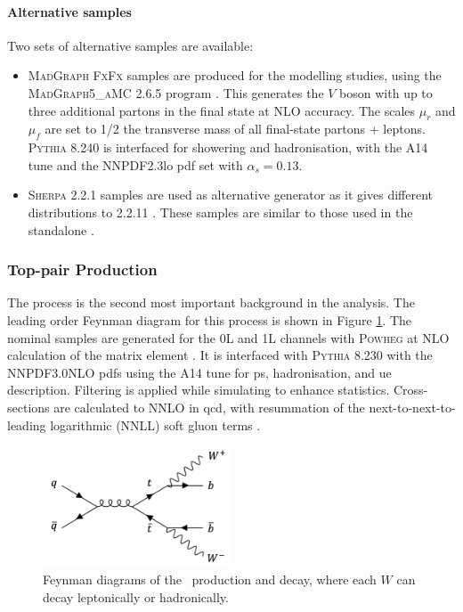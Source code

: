 \paragraph{Alternative samples} Two sets of alternative samples are available:
\begin{itemize}
  \item \textsc{MadGraph FxFx} samples are produced for the modelling studies, using the \textsc{MadGraph5\_aMC\@NLO} 2.6.5 program \cite{madgraph}. This generates the $V$ boson with up to three additional partons in the final state at NLO accuracy. The scales $\mu_r$ and $\mu_f$ are set to 1/2 the transverse mass of all final-state partons + leptons. \textsc{Pythia} 8.240 is interfaced for showering and hadronisation, with the A14 tune and the NNPDF2.3lo \gls{pdf} set with $\alpha_s = 0.13$.
  \item \textsc{Sherpa} 2.2.1 \cite{sherpa2.2paper} samples are used as alternative generator as it gives different \ptv distributions to 2.2.11 \cite{simVjet}. These samples are similar to those used in the standalone \vhc \cite{Collaboration:2721696}.
\end{itemize}

\subsubsection{Top-pair Production}
The \ttb process is the second most important background in the analysis. The leading order Feynman diagram for this process is shown in Figure \ref{fig:feynttb}. The nominal samples are generated for the 0L and 1L channels with \textsc{Powheg} at NLO calculation of the matrix element \cite{StefanoFrixione_2007, PaoloNason_2004}. It is interfaced with \textsc{Pythia} 8.230 with the NNPDF3.0NLO \gls{pdf}s using the A14 tune for \gls{ps}, hadronisation, and \gls{ue} description. Filtering is applied while simulating to enhance statistics. Cross-sections are calculated to NNLO in \gls{qcd}, with resummation of the next-to-next-to-leading logarithmic (NNLL) soft gluon terms \cite{CZAKON20142930}.

\begin{figure}[h!]
  \center
  \includegraphics[width=0.5\textwidth]{Images/VH/Feynman/ttb.png}
  \caption{Feynman diagrams of the \ttb\ production and decay, where each $W$ can decay leptonically or hadronically.} 
  \label{fig:feynttb}
\end{figure}

